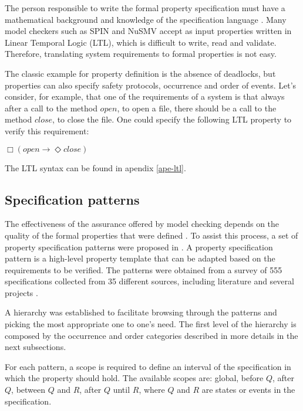 The person responsible to write the formal property specification must have a mathematical background and knowledge of the specification language \cite{Prospec}. Many model checkers such as SPIN and NuSMV accept as input properties written in Linear Temporal Logic (LTL), which is difficult to write, read and validate. Therefore, translating system requirements to formal properties is not easy.

The classic example for property definition is the absence of deadlocks, but properties can also specify safety protocols\cite{Merz}, occurrence and order of events. Let's consider, for example, that one of the requirements of a system is that always after a call to the method $open$, to open a file, there should be a call to the method $close$, to close the file. One could specify the following LTL property to verify this requirement:

\begin{center}
$\Box (open \rightarrow \Diamond close)$
\end{center}

The LTL syntax can be found in apendix \ref{ape-ltl}.

\subsection{Specification patterns}
\label{specpatterns}

The effectiveness of the assurance offered by model checking depends on the quality of the formal properties that were defined \cite{Prospec}. To assist this process, a set of property specification patterns were proposed in \cite{dwyer98}. A property specification pattern is a high-level property template that can be adapted based on the requirements to be verified. The patterns were obtained from a survey of 555 specifications collected from 35 different sources, including literature and several projects \cite{dwyer99:specpatt_survey}.

A hierarchy was established to facilitate browsing through the patterns and picking the most appropriate one to one's need. The first level of the hierarchy is composed by the occurrence and order categories described in more details in the next subsections.

For each pattern, a scope is required to define an interval of the specification in which the property should hold. The available scopes are: global, before $Q$, after $Q$, between $Q$ and $R$, after $Q$ until $R$, where $Q$ and $R$ are states or events in the specification.

